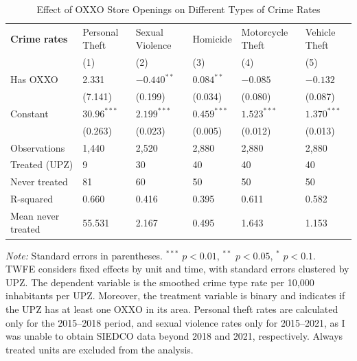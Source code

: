 \documentclass[12pt]{article}
\begin{document}
\begin{table}[htbp]
    \centering
    \caption{Effect of OXXO Store Openings on Different Types of Crime Rates}
    \label{tab:resultados_regresion}
    \small


    \begin{tabularx}{\textwidth}{l C C C C C}
    \hline\hline
    \textbf{Crime rates} & Personal Theft & Sexual Violence & Homicide & Motorcycle Theft & Vehicle Theft \\
    & (1) & (2) & (3) & (4) & (5) \\
    \hline
    Has OXXO           & 2.331         & $-0.440^{**}$ & $0.084^{**}$  & $-0.085$      & $-0.132$ \\
                       & (7.141)       & (0.199)       & (0.034)       & (0.080)       & (0.087)     \\
    Constant           & $30.96^{***}$ & $2.199^{***}$ & $0.459^{***}$ & $1.523^{***}$ & $1.370^{***}$ \\
                       & (0.263)       & (0.023)       & (0.005)       & (0.012)       & (0.013)   \\
    \hline
    Observations       & 1,440         & 2,520         & 2,880         & 2,880         & 2,880 \\
    Treated (UPZ)      & 9             & 30            & 40            & 40            & 40 \\
    Never treated      & 81            & 60            & 50            & 50            & 50 \\
    R-squared          & 0.660         & 0.416         & 0.395         & 0.611         & 0.582 \\
    Mean never treated & 55.531        & 2.167         & 0.495         & 1.643         & 1.153 \\
    \hline\hline
    \end{tabularx}

    \vspace{0.5em}
    \parbox{\textwidth}{\footnotesize
        \textit{Note:} Standard errors in parentheses. $^{***}$ $p<0.01$, $^{**}$ $p<0.05$, $^{*}$ $p<0.1$. \\
        TWFE considers fixed effects by unit and time, with standard errors clustered by UPZ. 
        The dependent variable is the smoothed crime type rate per 10,000 inhabitants per UPZ. 
        Moreover, the treatment variable is binary and indicates if the UPZ has at least one OXXO in its area. 
        Personal theft rates are calculated only for the 2015–2018 period, and sexual violence rates only for 2015–2021, as I was unable to obtain SIEDCO data beyond 2018 and 2021, respectively.
        Always treated units are excluded from the analysis.
    }
\end{table}
\end{document}
